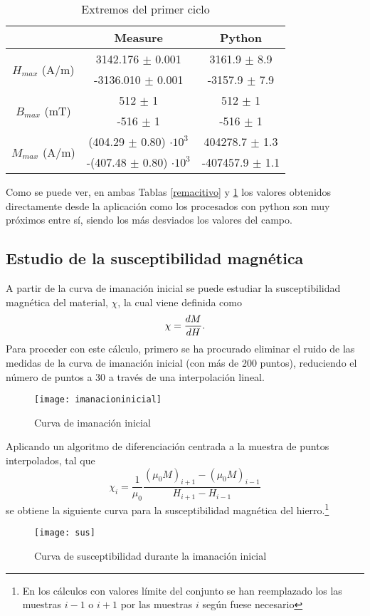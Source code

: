 \documentclass[fleqn,11pt]{SelfArx} %
\begin{document}
\begin{table}[htb!]
	\centering
	\begin{tabular}{c c c}
		\toprule
		& Measure & Python \\
		\midrule[0.7px]
		\multirow{2}{*}{$H_{max}$ (A/m)} & 3142.176 $\pm$ 0.001 & 3161.9 $\pm$ 8.9  \\
		& -3136.010 $\pm$ 0.001 & -3157.9 $\pm$ 7.9 \\
		\midrule
		\multirow{2}{*}{$B_{max}$ (mT)}& 512 $\pm$ 1 & 512 $\pm$ 1\\
		& -516 $\pm$ 1 & -516 $\pm$ 1 \\
		\midrule
		\multirow{2}{*}{$M_{max}$ (A/m)}& (404.29 $\pm$ 0.80) $\cdot 10^3$  & 404278.7 $\pm$ 1.3 \\
		& -(407.48  $\pm$ 0.80) $\cdot 10^3$  & -407457.9  $\pm$ 1.1  \\
		\bottomrule
	\end{tabular}
	\caption{Extremos del primer ciclo}
	\label{extremos}
\end{table}
Como se puede ver, en ambas Tablas \ref{remacitivo} y \ref{extremos} los valores obtenidos directamente desde la aplicación como los procesados con python son muy próximos entre sí, siendo los más desviados los valores del campo. 
  

\subsection{Estudio de la susceptibilidad magnética}
A partir de la curva de imanación inicial se puede estudiar la susceptibilidad magnética del material, $\chi$, la cual viene definida como 
\begin{equation}\label{susceptibility}
	\centering
	\chi = \frac{d M}{d H}.
\end{equation}
Para proceder con este cálculo, primero se ha procurado eliminar el ruido de las medidas de la curva de imanación inicial (con más de 200 puntos), reduciendo el número de puntos a 30 a través de una interpolación lineal.

\begin{figure}[ht!]\centering
	\texttt{[image: imanacioninicial]}
	\caption{Curva de imanación inicial}
	\label{fig:imanacioninicial}
\end{figure}
Aplicando un algoritmo de diferenciación centrada a la muestra de puntos interpolados, tal que 
\begin{equation}
 \chi_i = \frac{1}{\mu_0} \frac{(\mu_0 M)_{i + 1} - (\mu_0 M)_{i - 1}}{H_{i + 1} - H_{i - 1}}
\end{equation}
se obtiene la siguiente curva para la susceptibilidad magnética del hierro.\footnote{En los cálculos con valores límite del conjunto se han reemplazado los las muestras $i - 1$ o $i + 1$ por las muestras $i$ según fuese necesario}
\begin{figure}[ht!]\centering
	\texttt{[image: sus]}
	\caption{Curva de susceptibilidad durante la imanación inicial}
	\label{fig:susceptibilidad}
\end{figure}
\end{document}
